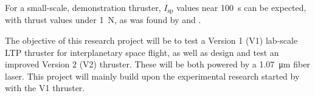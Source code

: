         For a small-scale, demonstration thruster, $I_\mathrm{sp}$ values near \qty{100}{s} can be expected, with thrust values under \qty{1}{N}, as was found by \textcite{toyodaThrustPerformanceCW2002} and \textcite{takanoDemonstrationDiodeLasersustained}.
        
        The objective of this research project will be to test a Version 1 (V1) lab-scale LTP thruster for interplanetary space flight, as well as design and test an improved Version 2 (V2) thruster. These will be both powered by a \qty{1.07}{μm} fiber laser. This project will mainly build upon the experimental research started by \textcite{duplayArgonLaserPlasmaThruster2024a} with the V1 thruster.

        
